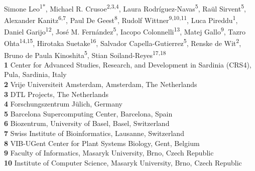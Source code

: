 \documentclass[10pt,letterpaper]{article}
\begin{document}
\vspace*{0.2in}

\begin{flushleft}
{\Large
\textbf{} %
}
\newline
\\

Simone Leo\textsuperscript{1*},
Michael R. Crusoe\textsuperscript{2,3,4},
Laura Rodríguez-Navas\textsuperscript{5}, 
Raül Sirvent\textsuperscript{5}, 
Alexander Kanitz\textsuperscript{6,7}, 
Paul De Geest\textsuperscript{8}, 
Rudolf Wittner\textsuperscript{9,10,11}, 
Luca Pireddu\textsuperscript{1}, 
Daniel Garijo\textsuperscript{12}, 
José M. Fernández\textsuperscript{5}, 
Iacopo Colonnelli\textsuperscript{13}, 
Matej Gallo\textsuperscript{9}, 
Tazro Ohta\textsuperscript{14,15}, 
Hirotaka Suetake\textsuperscript{16}, 
Salvador Capella-Gutierrez\textsuperscript{5}, 
Renske de Wit\textsuperscript{2}, 
Bruno de Paula Kinoshita\textsuperscript{5}, 
Stian Soiland-Reyes\textsuperscript{17,18}
\\
\bigskip
\textbf{1} Center for Advanced Studies, Research, and Development in Sardinia (CRS4), Pula, Sardinia, Italy
\\
\textbf{2} Vrije Universiteit Amsterdam, Amsterdam, The Netherlands
\\
\textbf{3} DTL Projects, The Netherlands
\\
\textbf{4} Forschungszentrum Jülich, Germany
\\
\textbf{5} Barcelona Supercomputing Center, Barcelona, Spain
\\
\textbf{6} Biozentrum, University of Basel, Basel, Switzerland
\\
\textbf{7} Swiss Institute of Bioinformatics, Lausanne, Switzerland
\\
\textbf{8} VIB-UGent Center for Plant Systems Biology, Gent, Belgium
\\
\textbf{9} Faculty of Informatics, Masaryk University, Brno, Czech Republic
\\
\textbf{10} Institute of Computer Science, Masaryk University, Brno, Czech Republic
\\

\end{flushleft}
\end{document}
